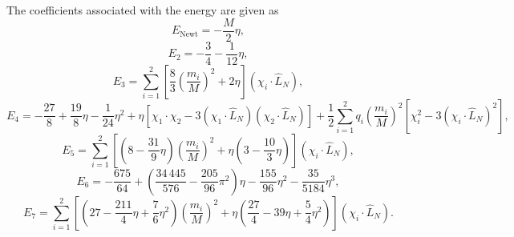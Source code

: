 The coefficients associated with the energy are
given as
%
\begin{equation}
%
E_{\textrm{Newt}} = -\frac{M}{2}\eta,
%
\end{equation} \begin{equation}
%
E_2 = -\frac{3}{4} - \frac{1}{12}\eta,
%
\end{equation} \begin{equation}
%
E_3 = \sum_{i=1}^2 \left[ \frac{8}{3} \left(\frac{m_i}{M}\right)^2 + 2 \eta \right] \left( \chi_i \cdot \hat{L}_N \right) ,
%
\end{equation} \begin{equation}
%
E_4 = -\frac{27}{8} + \frac{19}{8}\eta - \frac{1}{24}\eta^2 
+ \eta \left[ \chi_1 \cdot \chi_2 - 3 \left( \chi_1 \cdot \hat{L}_N \right) \left(  \chi_2 \cdot \hat{L}_N \right) \right] 
+ \frac{1}{2} \sum_{i=1}^2 q_i \left( \frac{m_i}{M}\right)^2 \left[ \chi_i^2 - 3 \left( \chi_i \cdot \hat{L}_N \right)^2 \right] ,
%
\end{equation} \begin{equation}
%
E_5 = \sum_{i=1}^2 \left[ \left(8 - \frac{31}{9}\eta\right) \left(\frac{m_i}{M}\right)^2 
+ \eta \left( 3 - \frac{10}{3} \eta \right)\right] \left( \chi_i \cdot \hat{L}_N \right) ,
%
\end{equation} \begin{equation}
%
E_6 = -\frac{675}{64} + \left(\frac{34\,445}{576} -\frac{205}{96}
\pi^2\right)\eta - \frac{155}{96}\eta^2 -\frac{35}{5184}\eta^3 ,
%
\end{equation} \begin{equation}
%
E_7 = \sum_{i=1}^2 \left[ \left( 27 - \frac{211}{4}\eta + \frac{7}{6} \eta^2 \right) \left(\frac{m_i}{M}\right)^2
 + \eta \left( \frac{27}{4} - 39 \eta + \frac{5}{4}\eta^2\right) \right] \left( \chi_i \cdot \hat{L}_N \right) .
 \end{equation}

